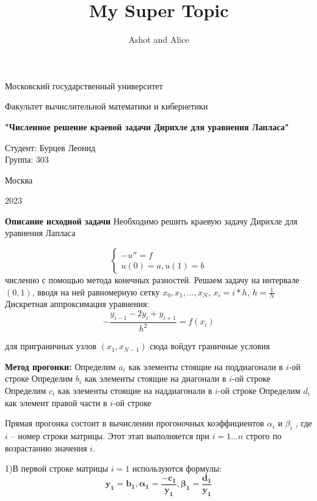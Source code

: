 \documentclass{beamer}
\title{My Super Topic}
\author{Ashot and Alice}
\begin{document}
\begin{frame}
\thispagestyle{empty}
\centerline{Московский государственный университет}
\vfill
\centerline{Факультет вычислительной математики и кибернетики}
\vfill
\vfill
\vfill
\vfill
\Large
\begin{centering}
{\bfseries "Численное решение краевой задачи Дирихле для уравнения Лапласа"}
\end{centering}
\normalsize
\vfill
\vfill
\vfill
\begin{flushright}
Студент: Бурцев Леонид\\
Группа: 303
\end{flushright}
\vfill
\vfill
\centerline{Москва}
\centerline{2023}
\pagebreak
\end{frame}

\begin{frame}
\textbf{Описание исходной задачи}
\newline
Необходимо решить краевую задачу Дирихле для уравнения Лапласа

\begin{equation*}
 \begin{cases}
   -u'' = f\\
   u(0) = a, u(1) = b 
 \end{cases}
\end{equation*}
численно с помощью метода конечных разностей.
\newline
Решаем задачу на интервале $(0, 1)$, вводя на ней равномерную сетку $x_0, x_1, ..., x_N$,
$x_i = i * h$,
$h = \frac{1}{N}$
Дискретная аппроксимация уравнения:
$$-\frac{y_{i-1}-2y_i+y_{i+1}}{h^{2}} = f(x_i)$$

для приграничных узлов $(x_1, x_{N-1})$
сюда войдут граничные условия
\end{frame}

\begin{frame}
\textbf{Метод прогонки: }
\newline
Определим $a_i$ как элементы стоящие на поддиагонали в $i$-ой строке
\newline
Определим $b_i$ как элементы стоящие на диагонали в $i$-ой строке
\newline
Определим $c_i$ как элементы стоящие на наддиагонали в $i$-ой строке
\newline
Определим $d_i$ как элемент правой части в $i$-ой строке
\newline

Прямая прогонка состоит в вычислении прогоночных коэффициентов $\alpha_i$ и $\beta_i$ , где $i$ – номер строки матрицы. Этот этап выполняется при $i = 1...n$ строго по возрастанию значения $i$.

1)В первой строке матрицы $i = 1$ используются формулы:
\[\mathbf{y_1=b_1, \alpha_1=\frac{-c_1}{y_1}, \beta_1=\frac{d_1}{y_1}}\]
\end{frame}
\end{document}
